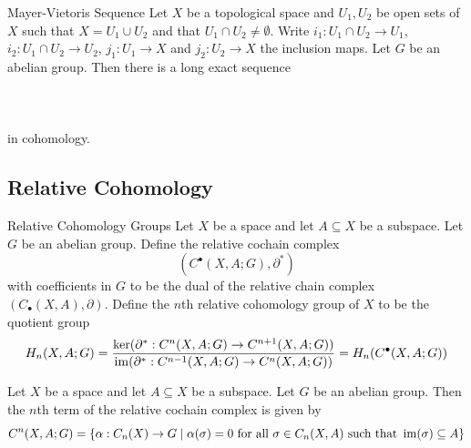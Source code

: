 \documentclass[a4paper]{article}
\begin{document}
\begin{thm}{Mayer-Vietoris Sequence}{} Let $X$ be a topological space and $U_1,U_2$ be open sets of $X$ such that $X=U_1\cup U_2$ and that $U_1\cap U_2\neq\emptyset$. Write $i_1:U_1\cap U_2\to U_1$, $i_2:U_1\cap U_2\to U_2$, $j_1:U_1\to X$ and $j_2:U_2\to X$ the inclusion maps. Let $G$ be an abelian group. Then there is a long exact sequence \\~\\
\\~\\
in cohomology. 
\end{thm}

\subsection{Relative Cohomology}
\begin{defn}{Relative Cohomology Groups}{} Let $X$ be a space and let $A\subseteq X$ be a subspace. Let $G$ be an abelian group. Define the relative cochain complex $$(C^\bullet(X,A;G),\partial^\ast)$$ with coefficients in $G$ to be the dual of the relative chain complex $(C_\bullet(X,A),\partial)$. Define the $n$th relative cohomology group of $X$ to be the quotient group $$H_n(X,A;G)=\frac{\ker(\partial^\ast:C^n(X,A;G)\to C^{n+1}(X,A;G))}{\operatorname{im}(\partial^\ast:C^{n-1}(X,A;G)\to C^n(X,A;G))}=H_n(C^\bullet(X,A;G))$$
\end{defn}

\begin{lmm}{}{} Let $X$ be a space and let $A\subseteq X$ be a subspace. Let $G$ be an abelian group. Then the $n$th term of the relative cochain complex is given by $$C^n(X,A;G)=\{\alpha:C_n(X)\to G\;|\;\alpha(\sigma)=0\text{ for all }\sigma\in C_n(X,A)\text{ such that }\operatorname{im}(\sigma)\subseteq A\}$$
\end{lmm}
\end{document}
